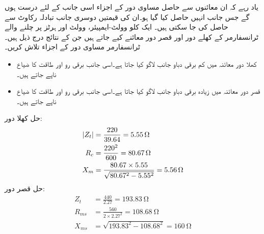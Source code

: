 یاد رہے کہ ان معائنوں سے حاصل مساوی دور کے  اجزاء اسی جانب کے لئے درست ہوں گے جس جانب انہیں حاصل کیا گیا ہو۔ان کی قیمتیں دوسری جانب تبادلہ رکاوٹ سے حاصل کی جا سکتی ہیں۔ 
%
ایک   کلو وولٹ-ایمپیئر،  وولٹ اور  ہرٹز پر چلنے والے ٹرانسفارمر کے کھلے دور اور قصر دور معائنے کیے جاتے ہیں جن کے نتائج درج ذیل ہیں۔ ٹرانسفارمر مساوی دور کے اجزاء تلاش کریں۔
\begin{itemize}
\item
کھلا دور معائنہ میں کم برقی دباو جانب   لاگو کیا جاتا ہے۔اسی جانب برقی رو  اور طاقت کا ضیاع  ناپے جاتے ہیں۔
\item
قصر دور معائنہ میں زیادہ برقی دباو جانب   لاگو کیا جاتا ہے۔اسی جانب برقی رو  اور طاقت کا ضیاع  ناپے جاتے ہیں۔
\end{itemize}

حل کھلا دور:
\begin{align*}
\abs{Z_t}&=\frac{220}{39.64}=\SI{5.55}{\ohm}\\
R_c&=\frac{220^2}{600}=\SI{80.67}{\ohm}\\
X_m&=\frac{80.67 \times 5.55}{\sqrt{80.67^2-5.55^2}}=\SI{5.56}{\ohm}
\end{align*}
حل قصر دور:
\begin{align*}
Z_t&=\frac{440}{2.27}=\SI{193.83}{\ohm}\\
R_{ms}&=\frac{560}{2 \times 2.27^2}=\SI{108.68}{\ohm}\\
X_{ms}&=\sqrt{193.83^2-108.68^2}=\SI{160}{\ohm}
\end{align*}

